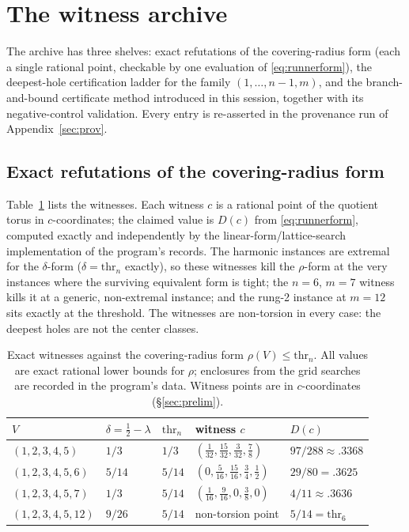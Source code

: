 
\section{The witness archive}\label{sec:witness}

The archive has three shelves: exact refutations of the covering-radius
form (each a single rational point, checkable by one evaluation of
\eqref{eq:runnerform}), the deepest-hole certification ladder for the
family $(1,\dots,n{-}1,m)$, and the branch-and-bound certificate method
introduced in this session, together with its negative-control
validation. Every entry is re-asserted in the provenance run of
Appendix~\ref{sec:prov}.

\subsection{Exact refutations of the covering-radius form}

Table~\ref{tab:refute} lists the witnesses. Each witness $c$ is a
rational point of the quotient torus in $c$-coordinates; the claimed
value is $D(c)$ from \eqref{eq:runnerform}, computed exactly and
independently by the linear-form/lattice-search implementation of the
program's records. The harmonic instances are extremal for the
$\delta$-form ($\delta=\mathrm{thr}_n$ exactly), so these witnesses kill
the $\rho$-form at the very instances where the surviving equivalent form
is tight; the $n=6$, $m=7$ witness kills it at a generic, non-extremal
instance; and the rung-2 instance at $m=12$ sits exactly at the
threshold. The witnesses are non-torsion in every case: the deepest
holes are not the center classes.

\begin{table}[htbp]
\centering
\footnotesize
\caption{Exact witnesses against the covering-radius form
$\rho(V)\le\mathrm{thr}_n$. All values are exact rational lower bounds
for $\rho$; enclosures from the grid searches are recorded in the
program's data. Witness points are in $c$-coordinates
(\S\ref{sec:prelim}).}
\label{tab:refute}
\begin{tabularx}{\textwidth}{@{} l l l >{\raggedright\arraybackslash}X l @{}}
\toprule
$V$ & $\delta=\tfrac12-\lambda$ & $\mathrm{thr}_n$ & witness $c$ &
$D(c)$ \\
\midrule
$(1,2,3,4,5)$ & $1/3$ & $1/3$ &
$(\tfrac1{32},\tfrac{15}{32},\tfrac3{32},\tfrac78)$ &
$97/288{\approx}.3368$ \\
$(1,2,3,4,5,6)$ & $5/14$ & $5/14$ &
$(0,\tfrac5{16},\tfrac{15}{16},\tfrac34,\tfrac12)$ & $29/80=.3625$ \\
$(1,2,3,4,5,7)$ & $1/3$ & $5/14$ &
$(\tfrac1{16},\tfrac9{16},0,\tfrac38,0)$ & $4/11{\approx}.3636$ \\
$(1,2,3,4,5,12)$ & $9/26$ & $5/14$ & non-torsion point &
$5/14=\mathrm{thr}_6$ \\
\bottomrule
\end{tabularx}
\end{table}

